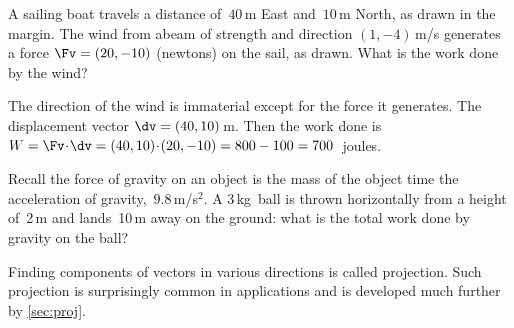 \begin{example} \label{eg:}
A sailing boat travels a distance of~\(40\)\,m East and~\(10\)\,m North, as drawn in the margin.
%
The wind from abeam of strength and direction \((1,-4)\)\,m/s generates a force \(\Fv=(20,-10)\) (newtons) on the sail, as drawn.
What is the work done by the wind?
\begin{solution} 
The direction of the wind is immaterial except for the force it generates.
The displacement vector \(\dv=(40,10)\)\,m.
Then the work done is \(W=\Fv\cdot\dv =(40,10)\cdot(20,-10) =800-100 =700\)~joules.
\end{solution}
\end{example}



\begin{activity}
Recall the force of gravity on an object is the mass of the object time the acceleration of gravity,~\(9.8\)\,m/s\({}^2\).
A 3\,kg~ball is thrown horizontally from a height of~2\,m and lands~10\,m away on the ground: what is the total work done by gravity on the ball?
\end{activity}


Finding components of vectors in various directions is called projection. 
Such projection is surprisingly common in applications and is developed much further by \autoref{sec:proj}.






